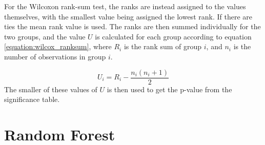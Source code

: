 
For the Wilcoxon rank-sum test, the ranks are instead assigned to the values themselves, with the smallest value being assigned the lowest rank. If there are ties the mean rank value is used. The ranks are then summed individually for the two groups, and the value $U$ is calculated for each group according to equation \eqref{equation:wilcox_ranksum}, where $R_i$ is the rank sum of group $i$, and $n_i$ is the number of observations in group $i$.

\begin{equation}
    \label{equation:wilcox_ranksum}
    U_i = R_i - \frac{n_i \left( n_i + 1 \right)}{2}
\end{equation}
The smaller of these values of $U$ is then used to get the p-value from the significance table. 

\section{Random Forest}


